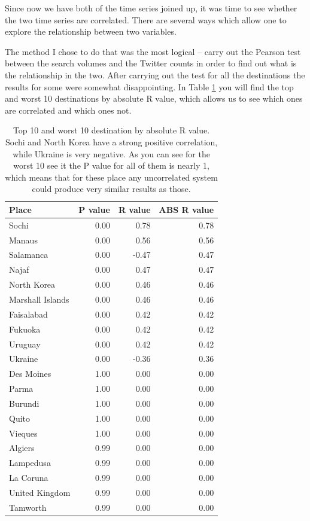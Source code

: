 \documentclass[minf,twoside,singlespacing,parskip,frontabs,notimes,11pt]{infthesis}
\begin{document}
Since now we have both of the time series joined up, it was time to see whether the two time series are correlated. There are several ways which allow one to explore the relationship between two variables. 


The method I chose to do that was the most logical -- carry out the Pearson test between the search volumes and the Twitter counts in order to find out what is the relationship in the two. After carrying out the test for all the destinations the results for some were somewhat disappointing.  In Table \ref{r-values} you will find the top and worst 10 destinations by absolute R value, which allows us to see which ones are correlated and which ones not.


\begin{table}[p!]
\begin{center}
\begin{tabular}{ l | r | r | r}
\textbf{Place} & \textbf{P value} & \textbf{R value} & \textbf{ABS R value}\\
\hline
Sochi & 0.00 & 0.78 & 0.78\\
Manaus & 0.00 & 0.56 & 0.56\\
Salamanca & 0.00 & -0.47 & 0.47\\
Najaf & 0.00 & 0.47 & 0.47\\
North Korea & 0.00 & 0.46 & 0.46\\
Marshall Islands & 0.00 & 0.46 & 0.46\\
Faisalabad & 0.00 & 0.42 & 0.42\\
Fukuoka & 0.00 & 0.42 & 0.42\\
Uruguay & 0.00 & 0.42 & 0.42\\
Ukraine & 0.00 & -0.36 & 0.36 \\
\hline
\hline
Des Moines & 1.00 & 0.00 & 0.00\\
Parma & 1.00 & 0.00 & 0.00\\
Burundi & 1.00 & 0.00 & 0.00\\
Quito & 1.00 & 0.00 & 0.00\\
Vieques & 1.00 & 0.00 & 0.00\\
Algiers & 0.99 & 0.00 & 0.00\\
Lampedusa & 0.99 & 0.00 & 0.00\\
La Coruna & 0.99 & 0.00 & 0.00\\
United Kingdom & 0.99 & 0.00 & 0.00\\
Tamworth & 0.99 & 0.00 & 0.00\\
\end{tabular}
\end{center}
\caption{Top 10 and worst 10 destination by absolute R value. Sochi and North Korea have a strong positive correlation, while Ukraine is very negative. As you can see for the worst 10 see it the P value for all of them is nearly 1, which means that for these place any uncorrelated system could produce very similar results as those. }
\label{r-values}
\end{table}
\end{document}
